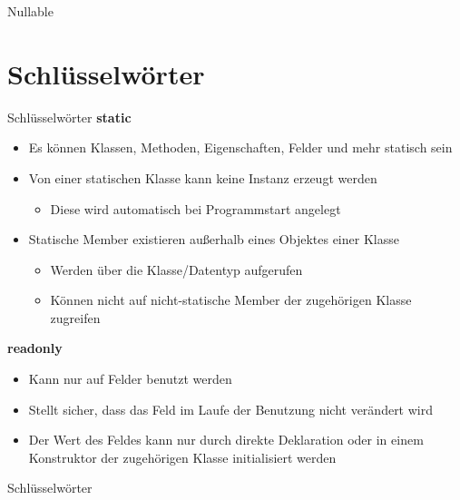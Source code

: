 \begin{frame}{Nullable}
		
\end{frame}

\section{Schlüsselwörter}
\begin{frame}{Schlüsselwörter}
	\textbf{static}\\
	\begin{itemize}
		\item Es können Klassen, Methoden, Eigenschaften, Felder und mehr statisch sein
		\item Von einer statischen Klasse kann keine Instanz erzeugt werden
		\begin{itemize}
			\item Diese wird automatisch bei Programmstart angelegt
		\end{itemize}
		\item Statische Member existieren außerhalb eines Objektes einer Klasse
		\begin{itemize}
			\item Werden über die Klasse/Datentyp aufgerufen
			\item Können nicht auf nicht-statische Member der zugehörigen Klasse zugreifen
		\end{itemize}
	\end{itemize}
	\textbf{readonly}\\
	\begin{itemize}
		\item Kann nur auf Felder benutzt werden
		\item Stellt sicher, dass das Feld im Laufe der Benutzung nicht verändert wird
		\item Der Wert des Feldes kann nur durch direkte Deklaration oder in einem Konstruktor der zugehörigen Klasse initialisiert werden
	\end{itemize}
\end{frame}

\begin{frame}{Schlüsselwörter}
	
\end{frame}

